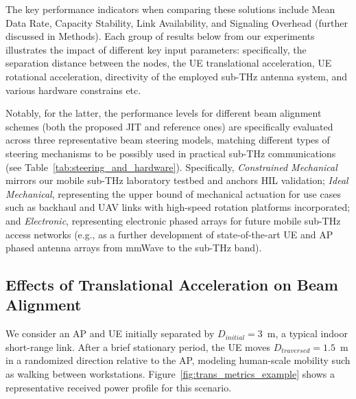 \documentclass[fleqn,10pt]{wlscirep}
\begin{document}
The key performance indicators when comparing these solutions include {\color{red}Mean Data Rate, Capacity Stability, Link Availability, and Signaling Overhead (further discussed in Methods)}. Each group of results below from our experiments illustrates the impact of different key input parameters: specifically, the separation distance between the nodes, the UE translational acceleration, UE rotational acceleration, directivity of the employed sub-THz antenna system, and various hardware constrains etc.

Notably, for the latter, the performance levels for different beam alignment schemes (both the proposed JIT and reference ones) are specifically evaluated across three representative beam steering models, matching different types of steering mechanisms to be possibly used in practical sub-THz communications (see Table~\ref{tab:steering_and_hardware}). Specifically, \textit{Constrained Mechanical} mirrors our mobile sub-THz laboratory testbed and anchors {\color{red}HIL} validation; \textit{Ideal Mechanical}, representing the upper bound of mechanical actuation for use cases such as backhaul and UAV links with high-speed rotation platforms incorporated; and \textit{Electronic}, representing electronic phased arrays for future mobile sub-THz access networks (e.g., as a further development of state-of-the-art UE and AP phased antenna arrays from mmWave to the sub-THz band).

\subsection*{Effects of Translational Acceleration on Beam Alignment}

We consider an AP and UE initially separated by $D_{initial} = 3$~m, a typical indoor short-range link\cite{9013236}. After a brief stationary period, the UE moves $D_{traversed} = 1.5$~m in a randomized direction relative to the AP, modeling human-scale mobility such as walking between workstations. Figure~\ref{fig:trans_metrics_example} shows a representative received power profile for this scenario.
\end{document}
